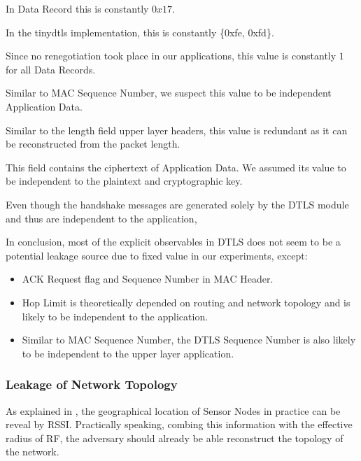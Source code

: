 \begin{description}[style=nextline]
	\item[Content Type]
	In Data Record this is constantly $0x17$.
	\item[Protocol Version]
	In the tinydtls implementation, this is constantly \{0xfe, 0xfd\}.
	\item[Epoch]
	Since no renegotiation took place in our applications, this value is constantly $1$ for all Data Records.
	\item[Sequence Number]
	Similar to MAC Sequence Number, we suspect this value to be independent  Application Data.
	\item[Length]
	Similar to the length field upper layer headers, this value is redundant as it can be reconstructed from the packet length.
	\item[Fragment]
	This field contains the ciphertext of Application Data. We assumed its value to be independent to the plaintext and cryptographic key.
\end{description}

Even though the handshake messages are generated solely by the DTLS module and thus are independent to the application,

In conclusion, most of the explicit observables in DTLS does not seem to be a potential leakage source due to fixed value in our experiments, except:

\begin{itemize}
	\item ACK Request flag and Sequence Number in MAC Header.
	\item Hop Limit is theoretically depended on routing and network topology and is likely to be independent to the application.
	\item Similar to MAC Sequence Number, the DTLS Sequence Number is also likely to be independent to the upper layer application.
\end{itemize}

\subsubsection{Leakage of Network Topology}

As explained in , the geographical location of Sensor Nodes in practice can be reveal by RSSI. Practically speaking, combing this information with the effective radius of RF, the adversary should already be able reconstruct the topology of the network.

